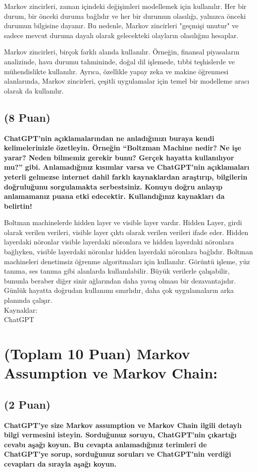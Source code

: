 \documentclass[11pt]{article}
\begin{document}
Markov zincirleri, zaman içindeki değişimleri modellemek için kullanılır. Her bir durum, bir önceki duruma bağlıdır ve her bir durumun olasılığı, yalnızca önceki durumun bilgisine dayanır. Bu nedenle, Markov zincirleri "geçmişi unutur" ve sadece mevcut duruma dayalı olarak gelecekteki olayların olasılığını hesaplar.

Markov zincirleri, birçok farklı alanda kullanılır. Örneğin, finansal piyasaların analizinde, hava durumu tahmininde, doğal dil işlemede, tıbbi teşhislerde ve mühendislikte kullanılır. Ayrıca, özellikle yapay zeka ve makine öğrenmesi alanlarında, Markov zincirleri, çeşitli uygulamalar için temel bir modelleme aracı olarak da kullanılır.

\subsection{(8 Puan)} \textbf{ChatGPT’nin açıklamalarından ne anladığınızı buraya kendi kelimelerinizle özetleyin. Örneğin ``Boltzman Machine nedir? Ne işe yarar? Neden bilmemiz gerekir bunu? Gerçek hayatta kullanılıyor mu?'' gibi. Anlamadığınız kısımlar varsa ve ChatGPT’nin açıklamaları yeterli gelmezse internet dahil farklı kaynaklardan araştırıp, bilgilerin doğruluğunu sorgulamakta serbestsiniz. Konuyu doğru anlayıp anlamamanız puana etki edecektir. Kullandığınız kaynakları da belirtin!}

Boltman machinelerde hidden layer ve visible layer vardır. Hidden Layer, girdi olarak verilen verileri, visible layer çıktı olarak verilen verileri ifade eder. Hidden layerdaki nöronlar visible layerdaki nöronlara ve hidden layerdaki nöronlara bağlıyken, visible layerdaki nöronlar hidden layerdaki nöronlara bağlıdır. Boltman machineleri denetimsiz öğrenme algoritmaları için kullanılır. Görüntü işleme, yüz tanıma, ses tanıma gibi alanlarda kullanılabilir. Büyük verilerle çalışabilir, bununla beraber diğer sinir ağlarından daha yavaş olması bir dezavantajıdır. Günlük hayatta doğrudan kullanımı sınırlıdır, daha çok uygulamaların arka planında çalışır.\\
Kaynaklar:\\
ChatGPT

\section{(Toplam 10 Puan) Markov Assumption ve Markov Chain:}

\subsection{(2 Puan)} \textbf{ChatGPT’ye size Markov assumption ve Markov Chain ilgili detaylı bilgi vermesini isteyin. Sorduğunuz soruyu, ChatGPT'nin çıkartığı cevabı aşağı koyun. Bu cevapta anlamadığınız terimleri de ChatGPT’ye sorup, sorduğunuz soruları ve ChatGPT’nin verdiği cevapları da sırayla aşağı koyun.}
\end{document}
